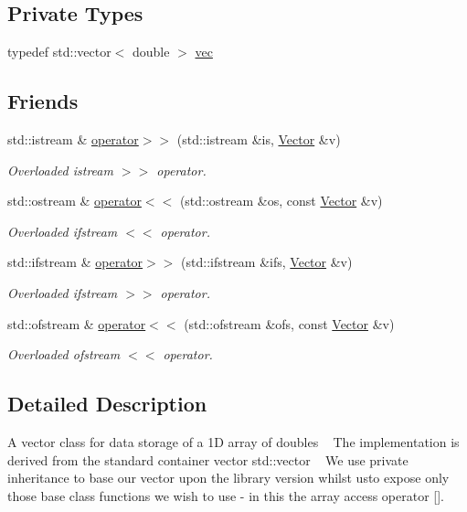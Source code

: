 \subsection*{Private Types}
\begin{DoxyCompactItemize}
\item 
typedef std\+::vector$<$ double $>$ \hyperlink{classVector_accafb2e9a427f9c9f2cf35278ea7b2db}{vec}
\end{DoxyCompactItemize}
\subsection*{Friends}
\begin{DoxyCompactItemize}
\item 
std\+::istream \& \hyperlink{classVector_ac198cff0f4196c66649278458eebf227}{operator$>$$>$} (std\+::istream \&is, \hyperlink{classVector}{Vector} \&v)
\begin{DoxyCompactList}\small\item\em Overloaded istream $>$$>$ operator. \end{DoxyCompactList}\item 
std\+::ostream \& \hyperlink{classVector_ac254b27efeb8486ee2f67821e3a21a60}{operator$<$$<$} (std\+::ostream \&os, const \hyperlink{classVector}{Vector} \&v)
\begin{DoxyCompactList}\small\item\em Overloaded ifstream $<$$<$ operator. \end{DoxyCompactList}\item 
std\+::ifstream \& \hyperlink{classVector_ab6009b37fac65598b3db164dc4f19fed}{operator$>$$>$} (std\+::ifstream \&ifs, \hyperlink{classVector}{Vector} \&v)
\begin{DoxyCompactList}\small\item\em Overloaded ifstream $>$$>$ operator. \end{DoxyCompactList}\item 
std\+::ofstream \& \hyperlink{classVector_a8e755f5550c983df730602890058d990}{operator$<$$<$} (std\+::ofstream \&ofs, const \hyperlink{classVector}{Vector} \&v)
\begin{DoxyCompactList}\small\item\em Overloaded ofstream $<$$<$ operator. \end{DoxyCompactList}\end{DoxyCompactItemize}


\subsection{Detailed Description}
A vector class for data storage of a 1D array of doubles ~\newline
 The implementation is derived from the standard container vector std\+::vector ~\newline
 We use private inheritance to base our vector upon the library version whilst  usto expose only those base class functions we wish to use -\/ in this  the array access operator \mbox{[}\mbox{]}. 

